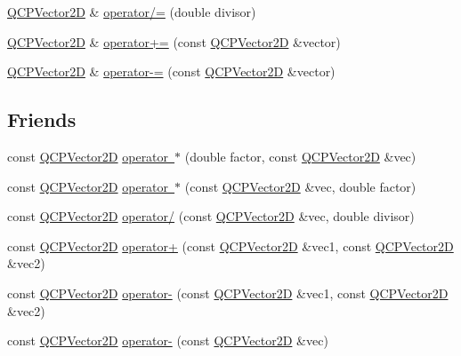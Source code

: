 \begin{DoxyCompactItemize}
\item 
\mbox{\hyperlink{class_q_c_p_vector2_d}{Q\+C\+P\+Vector2D}} \& \mbox{\hyperlink{class_q_c_p_vector2_d_aefa55eb9282c066a330ca281881e0ec0}{operator/=}} (double divisor)
\item 
\mbox{\hyperlink{class_q_c_p_vector2_d}{Q\+C\+P\+Vector2D}} \& \mbox{\hyperlink{class_q_c_p_vector2_d_aa2c34754ce8839b2d074dec741783c5e}{operator+=}} (const \mbox{\hyperlink{class_q_c_p_vector2_d}{Q\+C\+P\+Vector2D}} \&vector)
\item 
\mbox{\hyperlink{class_q_c_p_vector2_d}{Q\+C\+P\+Vector2D}} \& \mbox{\hyperlink{class_q_c_p_vector2_d_a3a2e906bb924983bb801e89f28a3d566}{operator-\/=}} (const \mbox{\hyperlink{class_q_c_p_vector2_d}{Q\+C\+P\+Vector2D}} \&vector)
\end{DoxyCompactItemize}
\subsection*{Friends}
\begin{DoxyCompactItemize}
\item 
const \mbox{\hyperlink{class_q_c_p_vector2_d}{Q\+C\+P\+Vector2D}} \mbox{\hyperlink{class_q_c_p_vector2_d_a7fdd50278959df14c8fdbcbaa16e6073}{operator $\ast$}} (double factor, const \mbox{\hyperlink{class_q_c_p_vector2_d}{Q\+C\+P\+Vector2D}} \&vec)
\item 
const \mbox{\hyperlink{class_q_c_p_vector2_d}{Q\+C\+P\+Vector2D}} \mbox{\hyperlink{class_q_c_p_vector2_d_a5d2819b8e6c9566f916a2091a2eb07de}{operator $\ast$}} (const \mbox{\hyperlink{class_q_c_p_vector2_d}{Q\+C\+P\+Vector2D}} \&vec, double factor)
\item 
const \mbox{\hyperlink{class_q_c_p_vector2_d}{Q\+C\+P\+Vector2D}} \mbox{\hyperlink{class_q_c_p_vector2_d_aa69909afc8c656999a2ea292ea01244b}{operator/}} (const \mbox{\hyperlink{class_q_c_p_vector2_d}{Q\+C\+P\+Vector2D}} \&vec, double divisor)
\item 
const \mbox{\hyperlink{class_q_c_p_vector2_d}{Q\+C\+P\+Vector2D}} \mbox{\hyperlink{class_q_c_p_vector2_d_a24cc5985429b12dbed4d0d3c5a917d20}{operator+}} (const \mbox{\hyperlink{class_q_c_p_vector2_d}{Q\+C\+P\+Vector2D}} \&vec1, const \mbox{\hyperlink{class_q_c_p_vector2_d}{Q\+C\+P\+Vector2D}} \&vec2)
\item 
const \mbox{\hyperlink{class_q_c_p_vector2_d}{Q\+C\+P\+Vector2D}} \mbox{\hyperlink{class_q_c_p_vector2_d_a9e01331d8debf0877ee4cba9abd83605}{operator-\/}} (const \mbox{\hyperlink{class_q_c_p_vector2_d}{Q\+C\+P\+Vector2D}} \&vec1, const \mbox{\hyperlink{class_q_c_p_vector2_d}{Q\+C\+P\+Vector2D}} \&vec2)
\item 
const \mbox{\hyperlink{class_q_c_p_vector2_d}{Q\+C\+P\+Vector2D}} \mbox{\hyperlink{class_q_c_p_vector2_d_a14c807d345ee3f22d6809bb5a4137b52}{operator-\/}} (const \mbox{\hyperlink{class_q_c_p_vector2_d}{Q\+C\+P\+Vector2D}} \&vec)
\end{DoxyCompactItemize}
